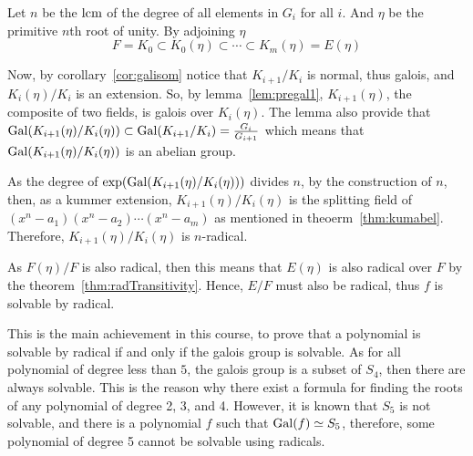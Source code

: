 \documentclass{article}
\begin{document}
{{      Let $n$ be the $\operatorname{lcm}$ of the degree of all elements in $G_i$ for all $i$. And $\eta$ be the primitive $n$th root 
      of unity. By adjoining $\eta$
      \[ F = K_0 \subset K_0(\eta) \subset \cdots \subset K_m(\eta) = E(\eta) \]

      Now, by corollary~\ref{cor:galisom} notice that $K_{i+1}/K_i$ is normal, thus galois, 
      and $K_i(\eta)/K_i$ is an extension. So, by lemma~\ref{lem:pregal1}, 
      $K_{i+1}(\eta)$, the composite of two fields, is galois over $K_i(\eta)$.
      The lemma also provide that $\operatorname{Gal}(K_{i+1}(\eta)/K_{i}(\eta)) \subset \operatorname{Gal}(K_{i+1}/K_i) = \frac{G_{i}}{G_{i+1}}$ 
      which means that $\operatorname{Gal}(K_{i+1}(\eta)/K_i(\eta))$ is an abelian group.

      As the degree of $\exp( \operatorname{Gal}(K_{i+1}(\eta)/K_i(\eta)) )$ divides $n$, by the construction of $n$, 
      then, as a kummer extension, $K_{i+1}(\eta)/K_i(\eta)$ is the splitting field of $(x^n - a_1)(x^n - a_2)\cdots(x^n - a_m)$ 
      as mentioned in theoerm~\ref{thm:kumabel}.
      Therefore, $K_{i+1}(\eta)/K_i(\eta)$ is $n$-radical.

      As $F(\eta)/F$ is also radical, then this means that $E(\eta)$ is also radical over $F$ by the theorem~\ref{thm:radTransitivity}.
      Hence, $E/F$ must also be radical, thus $f$ is solvable by radical.
    }
  }

  This is the main achievement in this course, to prove that a polynomial is solvable by radical if and only if the galois group is 
  solvable. As for all polynomial of degree less than $5$, the galois group is a subset of $S_4$, then there are always solvable. 
  This is the reason why there exist a formula for finding the roots of any polynomial of degree 2, 3, and 4. However, 
  it is known that $S_5$ is not solvable, and there is a polynomial $f$ such that $\operatorname{Gal}(f) \simeq S_5$, therefore, some polynomial 
  of degree 5 cannot be solvable using radicals.
\end{document}
